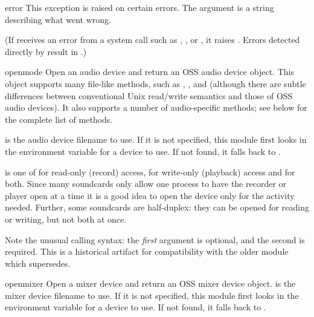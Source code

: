 \begin{excdesc}{error}
This exception is raised on certain errors.  The argument is a string
describing what went wrong.

(If  receives an error from a system call such as
, , or , it
raises .  Errors detected directly by
 result in .)
\end{excdesc}

\begin{funcdesc}{open}{mode}
Open an audio device and return an OSS audio device object.  This
object supports many file-like methods, such as ,
, and  (although there are subtle
differences between conventional Unix read/write semantics and those of
OSS audio devices).  It also supports a number of audio-specific
methods; see below for the complete list of methods.

 is the audio device filename to use.  If it is not
specified, this module first looks in the environment variable
 for a device to use.  If not found, it falls back to
.

 is one of  for read-only (record) access,
 for write-only (playback) access and  for both.
Since many soundcards only allow one process to have the recorder or
player open at a time it is a good idea to open the device only for the
activity needed.  Further, some soundcards are half-duplex: they can be
opened for reading or writing, but not both at once.

Note the unusual calling syntax: the \emph{first} argument is optional,
and the second is required.  This is a historical artifact for
compatibility with the older  module which
 supersedes.  %
\end{funcdesc}

\begin{funcdesc}{openmixer}{}
Open a mixer device and return an OSS mixer device object.  
 is the mixer device filename to use.  If it is
not specified, this module first looks in the environment variable
 for a device to use.  If not found, it falls back to
.

\end{funcdesc}

